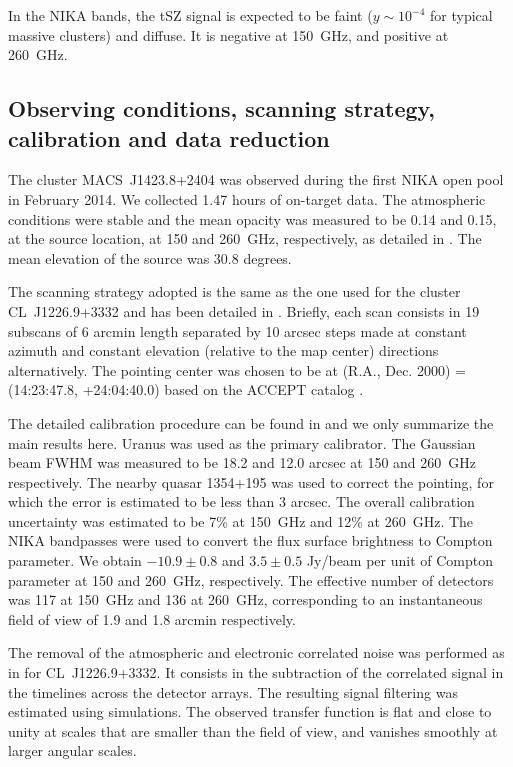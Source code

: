 \documentclass[twocolumn,traditabstract]{aa}
\begin{document}
In the NIKA bands, the tSZ signal is expected to be faint ($y \sim 10^{-4}$ for typical massive clusters) and diffuse. It is negative at 150~GHz, and positive at 260~GHz.

\subsection{Observing conditions, scanning strategy, calibration and data reduction}
The cluster \mbox{MACS~J1423.8+2404} was observed during the first NIKA open pool in February 2014. We collected 1.47 hours of on-target data. The atmospheric conditions were stable and the mean opacity was measured to be 0.14 and 0.15, at the source location, at 150 and 260~GHz, respectively, as detailed in \cite{catalano2014}. The mean elevation of the source was 30.8 degrees.

The scanning strategy adopted is the same as the one used for the cluster \mbox{CL~J1226.9+3332} and has been detailed in \cite{adam2014}. Briefly, each scan consists in 19 subscans of 6 arcmin length separated by 10 arcsec steps made at constant azimuth and constant elevation (relative to the map center) directions alternatively. The pointing center was chosen to be at (R.A., Dec. 2000) = (14:23:47.8, +24:04:40.0) based on the ACCEPT catalog \citep{cavagnolo2009}.

The detailed calibration procedure can be found in \cite{adam2014} and we only summarize the main results here. Uranus was used as the primary calibrator. The Gaussian beam FWHM was measured to be 18.2 and 12.0 arcsec at 150 and 260~GHz respectively. The nearby quasar 1354+195 was used to correct the pointing, for which the error is estimated to be less than 3 arcsec. The overall calibration uncertainty was estimated to be 7\% at 150~GHz and 12\% at 260~GHz. The NIKA bandpasses were used to convert the flux surface brightness to Compton parameter. We obtain $-10.9 \pm 0.8$ and $3.5 \pm 0.5$ Jy/beam per unit of Compton parameter at 150 and 260~GHz, respectively. The effective number of detectors was 117 at 150~GHz and 136 at 260~GHz, corresponding to an instantaneous field of view of 1.9 and 1.8 arcmin respectively.

The removal of the atmospheric and electronic correlated noise was performed as in \cite{adam2014} for \mbox{CL~J1226.9+3332}. It consists in the subtraction of the correlated signal in the timelines across the detector arrays. The resulting signal filtering was estimated using simulations. The observed transfer function is flat and close to unity at scales that are smaller than the field of view, and vanishes smoothly \citep[see][]{adam2014} at larger angular scales.
\end{document}
